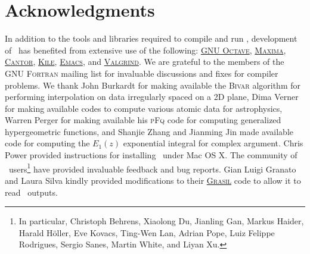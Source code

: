 \chapter{Acknowledgments}

In addition to the tools and libraries required to compile and run \glc, development of \glc\ has benefited from extensive use of the following: \href{http://www.gnu.org/software/octave/}{{\normalfont \scshape GNU Octave}}, \href{http://maxima.sourceforge.net/}{{\normalfont \scshape Maxima}}, \href{http://edu.kde.org/cantor/}{{\normalfont \scshape Cantor}}, \href{http://kile.sourceforge.net/}{{\normalfont \scshape Kile}}, \href{http://www.gnu.org/software/emacs/}{{\normalfont \scshape Emacs}}, and \href{http://valgrind.org/}{{\normalfont \scshape Valgrind}}. We are grateful to the members of the {\normalfont \scshape GNU Fortran} mailing list for invaluable discussions and fixes for compiler problems. We thank John Burkardt for making available the {\normalfont \scshape Bivar} algorithm for performing interpolation on data irregularly spaced on a 2D plane, Dima Verner for making available codes to compute various atomic data for astrophysics, Warren Perger for making available his {\normalfont \scshape pFq} code for computing generalized hypergeometric functions, and Shanjie Zhang and Jianming Jin made available code for computing the $E_1(z)$ exponential integral for complex argument. Chris Power provided instructions for installing \glc\ under Mac OS X. The community of \glc\ users\footnote{In particular, Christoph Behrens, Xiaolong Du, Jianling Gan, Markus Haider, Harald H\"oller, Eve Kovacs, Ting-Wen Lan, Adrian Pope, Luiz Felippe Rodrigues, Sergio Sanes, Martin White, and Liyan Xu.} have provided invaluable feedback and bug reports. Gian Luigi Granato and Laura Silva kindly provided modifications to their \href{http://adlibitum.oats.inaf.it/silva/grasil/syntax.html}{\normalfont \scshape Grasil} code to allow it to read \glc\ outputs.
